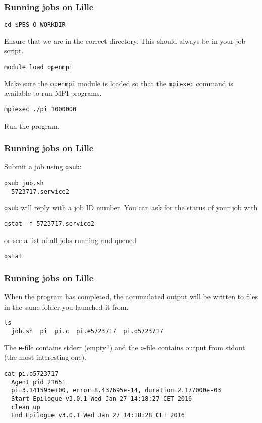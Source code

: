 \begin{frame}[fragile]
  \frametitle{Running jobs on Lille}
\begin{lstlisting}[style=shell]
  cd $PBS_O_WORKDIR
\end{lstlisting}
  Ensure that we are in the correct directory. This should always be in your job
  script.
\begin{lstlisting}[style=shell]
  module load openmpi
\end{lstlisting}
  Make sure the \texttt{openmpi} module is loaded so that the \texttt{mpiexec}
  command is available to run MPI programs.
\begin{lstlisting}[style=shell]
  mpiexec ./pi 1000000
\end{lstlisting}
  Run the program.
\end{frame}

\begin{frame}[fragile]
  \frametitle{Running jobs on Lille}
  Submit a job using \texttt{qsub}:
\begin{lstlisting}[style=shell]
  qsub job.sh
  5723717.service2
\end{lstlisting}
  \texttt{qsub} will reply with a job ID number. You can ask for the status of
  your job with
\begin{lstlisting}[style=shell]
  qstat -f 5723717.service2
\end{lstlisting}
  or see a list of all jobs running and queued
\begin{lstlisting}[style=shell]
  qstat
\end{lstlisting}
\end{frame}

\begin{frame}[fragile]
  \frametitle{Running jobs on Lille}
  When the program has completed, the accumulated output will be written to
  files in the same folder you launched it from.
\begin{lstlisting}[style=shell]
  ls
  job.sh  pi  pi.c  pi.e5723717  pi.o5723717
\end{lstlisting}
  The \texttt{e}-file contains stderr (empty?) and the \texttt{o}-file contains
  output from stdout (the most interesting one).
\begin{lstlisting}[style=shell,basicstyle=\ttfamily\footnotesize]
  cat pi.o5723717
  Agent pid 21651
  pi=3.141593e+00, error=8.437695e-14, duration=2.177000e-03
  Start Epilogue v3.0.1 Wed Jan 27 14:18:27 CET 2016
  clean up
  End Epilogue v3.0.1 Wed Jan 27 14:18:28 CET 2016
\end{lstlisting}
\end{frame}

